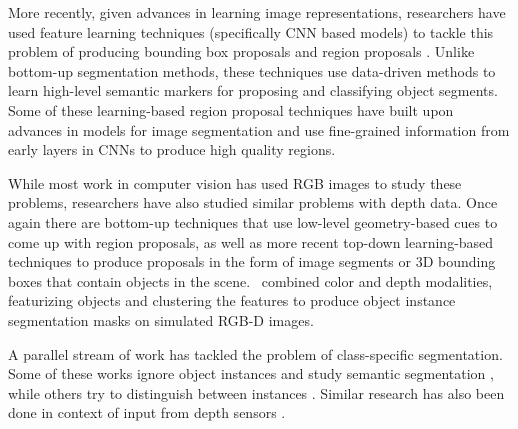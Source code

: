 \documentclass[letterpaper, 10 pt, conference]{ieeeconf}  \pdfoutput=1
\numberwithin{equation}{section}
\begin{document}
More recently, given advances in learning image representations, researchers have
used feature learning techniques (specifically CNN based models) to tackle this problem of producing 
bounding box proposals \cite{kuo2015deepbox, ren2015faster} and 
region proposals \cite{pinheiro2015learning, pinheiro2016learning}.
Unlike bottom-up segmentation methods, these techniques use data-driven methods 
to learn high-level semantic markers for proposing and classifying object segments.
Some of these learning-based region proposal techniques \cite{pinheiro2016learning} 
have built upon advances in models for image segmentation and use fine-grained 
information from early layers in CNNs \cite{long2015fully, hariharan2015hypercolumns}
to produce high quality regions.

While most work in computer vision has used RGB images to study these problems,
researchers have also studied similar problems with depth data. Once again there are
bottom-up techniques \cite{rusu2010semantic, rusu20113d, vo2015octree,
rabbani2006segmentation, gupta2013perceptual, gupta2014learning}
that use low-level geometry-based cues to come up with region proposals, as well as more recent
top-down learning-based techniques to produce proposals \cite{chen20183d}
in the form of image segments or 3D bounding boxes that contain objects in the scene.~\citet{shao2018clusternet} combined color and depth modalities, featurizing objects and clustering the features to produce object instance segmentation masks on simulated RGB-D images.

A parallel stream of work has tackled the problem of class-specific segmentation. Some 
of these works ignore object instances and study semantic segmentation \cite{long2015fully, 
pinheiro2016learning, garcia2017review, lin2017refinenet},
while others try to distinguish between instances 
\cite{he2017mask, hariharan2014simultaneous}.
Similar research has also been done in context of input from depth sensors
\cite{gupta2014learning, qi2017pointnet, ye2017depth, chen2015multi, wang2018sgpn}. 
\end{document}
